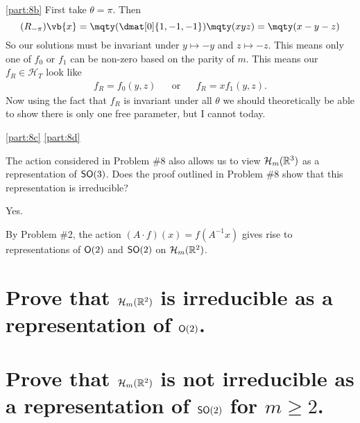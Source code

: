 \documentclass[
	pages,
	boxes,
	color=WildStrawberry
]{homework}
\begin{document}
\begin{solution}
	\ref{part:8b}
	First take $\theta = \pi$. Then
	\begin{equation*}
		(R_{-\pi})\vb{x} = \mqty(\dmat[0]{1, -1, -1})\mqty(x \\ y \\ z) = \mqty(x \\ -y \\ -z)
	\end{equation*}
	So our solutions must be invariant under $y\mapsto -y$ and $z\mapsto -z$. This means only one of $f_0$ or $f_1$ can be non-zero based on the parity of $m$. This means our $f_R\in\mathcal{H}_T$ look like
	\begin{align*}
		f_R = f_0(y, z) &  & \text{or} &  & f_R = xf_1(y, z).
	\end{align*}
	Now using the fact that $f_R$ is invariant under all $\theta$ we should theoretically be able to show there is only one free parameter, but I cannot today.

	\ref{part:8c}
	\ref{part:8d}
\end{solution}

\begin{problem}
The action considered in Problem \#8 also allows us to view $\mathcal{H}_m(\mathbb{R}^3)$ as a representation of $\mathsf{SO}(3)$. Does the proof outlined in Problem \#8 show that this representation is irreducible?
\end{problem}

\begin{solution}
	Yes.
\end{solution}

\begin{problem}
By Problem \#2, the action $(A\cdot f)(x) = f(A^{-1}x)$ gives rise to representations of $\mathsf{O}(2)$ and $\mathsf{SO}(2)$ on $\mathcal{H}_m(\mathbb{R}^2)$.
\begin{parts}
	\part{Prove that $\mathcal{H}_m(\mathbb{R}^2)$ is irreducible as a representation of $\mathsf{O}(2)$.}\label{part:10a}
	\part{Prove that $\mathcal{H}_m(\mathbb{R}^2)$ is not irreducible as a representation of $\mathsf{SO}(2)$ for $m \geq 2$.}\label{part:10b}
\end{parts}
\end{problem}

\begin{solution}
	\ref{part:10a}

	\ref{part:10b}
\end{solution}
\end{document}
